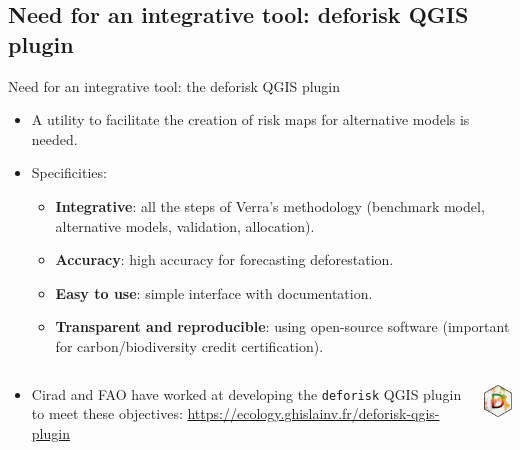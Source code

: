 \documentclass[10pt,table,dvipsnames,compress]{beamer}
\begin{document}
\subsection{Need for an integrative tool: deforisk QGIS plugin}
\label{sec:org7378434}

\begin{frame}[label={sec:org7881967},fragile]{Need for an integrative tool: the deforisk QGIS plugin}
 \begin{itemize}
\item A utility to facilitate the creation of risk maps for alternative models is needed.
\item Specificities:
\begin{itemize}
\item \textbf{Integrative}: all the steps of Verra's methodology (benchmark model, alternative models, validation, allocation).
\item \textbf{Accuracy}: high accuracy for forecasting deforestation.
\item \textbf{Easy to use}: simple interface with documentation.
\item \textbf{Transparent and reproducible}: using open-source software (important for carbon/biodiversity credit certification).
\end{itemize}
\end{itemize}

\begin{columns}
\begin{column}{0.8\columnwidth}
\begin{itemize}
\item Cirad and FAO have worked at developing the \texttt{deforisk} QGIS plugin to meet these objectives: \url{https://ecology.ghislainv.fr/deforisk-qgis-plugin}
\end{itemize}
\end{column}

\begin{column}{0.2\columnwidth}
\includegraphics[width=1.5cm]{figs/logo-deforisk.png}
\end{column}
\end{columns}
\end{frame}

\end{document}
